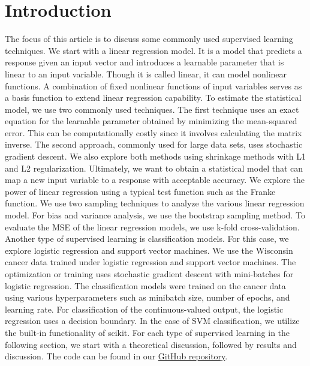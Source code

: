 \section{Introduction} \label{sec:introduction}

The focus of this article is to discuss some commonly used supervised learning techniques. \newline \newline
We start with a linear regression model. It is a model that predicts a response given an input vector and introduces a learnable parameter that is linear to an input variable. Though it is called linear, it can model nonlinear functions. A combination of fixed nonlinear functions of input variables serves as a basis function to extend linear regression capability. To estimate the statistical model, we use two commonly used techniques. The first technique uses an exact equation for the learnable parameter obtained by minimizing the mean-squared error. This can be computationally costly since it involves calculating the matrix inverse. The second approach, commonly used for large data sets, uses stochastic gradient descent. We also explore both methods using shrinkage methods with L1 and L2 regularization. Ultimately, we want to obtain a statistical model that can map a new input variable to a response with acceptable accuracy. \newline \newline
We explore the power of linear regression using a typical test function such as the Franke function. We use two sampling techniques to analyze the various linear regression model. For bias and variance analysis, we use the bootstrap sampling method. To evaluate the MSE of the linear regression models, we use k-fold cross-validation. \newline \newline
Another type of supervised learning is classification models. For this case, we explore logistic regression and support vector machines. We use the Wisconsin cancer data trained under logistic regression and support vector machines. The optimization or training uses stochastic gradient descent with mini-batches for logistic regression. The classification models were trained on the cancer data using various hyperparameters such as minibatch size, number of epochs, and learning rate. For classification of the continuous-valued output, the logistic regression uses a decision boundary. In the case of SVM classification, we utilize the built-in functionality of scikit. \newline \newline
For each type of supervised learning in the following section, we start with a theoretical discussion, followed by results and discussion. \newline \newline
The code can be found in our \href{https://github.com/am-kaiser/CompSci-Project-1}{GitHub repository}.
